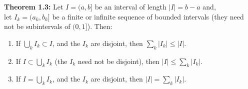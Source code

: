 \textbf{Theorem 1.3: } Let $I = (a, b]$ be an interval of length $|I| = b - a$ and,\\
let $I_k = (a_k, b_k]$ be a finite or infinite sequence of bounded intervals (they need not be subintervals of $(0,1]$). Then:

\begin{enumerate}[label=\textbf{\roman*.}, topsep=0pt, itemsep=-3pt]
	\item If $\bigcup_k I_k \subset I$, and the $I_k$ are disjoint, then $\sum_k |I_k| \leq |I|$.
	\item If $I \subset \bigcup_k I_k$ (the $I_k$ need not be disjoint), then $|I| \leq \sum_k |I_k|$.
	\item If $I = \bigcup_k I_k$, and the $I_k$ are disjoint, then $|I| = \sum_k |I_k|$.
\end{enumerate}

